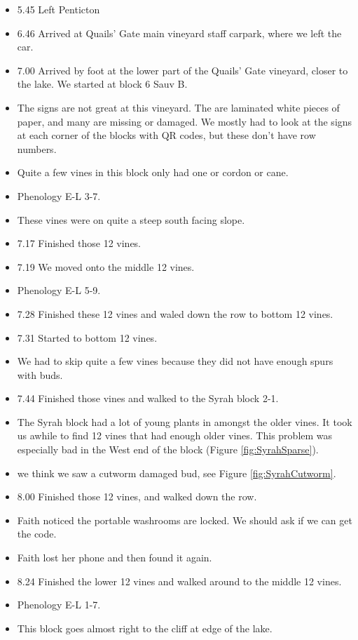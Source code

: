 \documentclass[11pt,letter]{article}
\newenvironment{smitemize}{
\begin{itemize}
  \setlength{\itemsep}{0pt}
  \setlength{\parskip}{0.8pt}
  \setlength{\parsep}{0pt}}
{\end{itemize}
}
\begin{document}
\begin{smitemize}
\item 5.45 Left Penticton 
\item 6.46 Arrived at Quails' Gate main vineyard staff carpark, where we left the car.
\item 7.00 Arrived by foot at the lower part of the Quails' Gate vineyard, closer to the lake. We started at block 6 Sauv B.
\item The signs are not great at this vineyard. The are laminated white pieces of paper, and many are missing or damaged. We mostly had to look at the signs at each corner of the blocks with QR codes, but these don't have row numbers.
\item Quite a few vines in this block only had one or cordon or cane. 
\item Phenology E-L 3-7.{}
\item These vines were on quite a steep south facing slope.  
\item 7.17 Finished those 12 vines.
\item 7.19 We moved onto the middle 12 vines. 
\item Phenology E-L 5-9.
\item 7.28 Finished these 12 vines and waled down the row to bottom 12 vines. 
\item 7.31 Started to bottom 12 vines.
\item We had to skip quite a few vines because they did not have enough spurs with buds. 
\item 7.44 Finished those vines and walked to the Syrah block 2-1.
\item The Syrah block had a lot of young plants in amongst the older vines. It took us awhile to find 12 vines that had enough older vines. This problem was especially bad in the West end of the block (Figure \ref{fig:SyrahSparse}).
\item we think we saw a cutworm damaged bud, see Figure \ref{fig:SyrahCutworm}. 
\item 8.00 Finished those 12 vines, and walked down the row. 
\item Faith noticed the portable washrooms are locked. We should ask if we can get the code. 
\item Faith lost her phone and then found it again.
\item 8.24 Finished the lower 12 vines and walked around to the middle 12 vines. 
\item Phenology E-L 1-7.
\item This block goes almost right to the cliff at edge of the lake. 

\end{smitemize}
\end{document}
